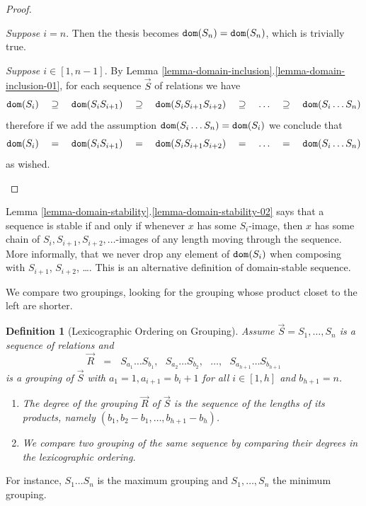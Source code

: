 \documentclass{lmcs}
\newtheorem{definition}[theorem]{Definition}
\begin{document}
\begin{proof}
\begin{enumerate}
\emph{Suppose $i=n$}. 
Then the thesis becomes ${\tt dom}(S_n) =  {\tt dom}(S_n)$, which is trivially true.

\emph{Suppose $i \in [1,n-1]$}.
By Lemma \ref{lemma-domain-inclusion}.\ref{lemma-domain-inclusion-01},
for each sequence $\vec{S}$ of relations we have 
$$
\dom(S_i)  \ \ \ \supseteq \ \ \ 
\dom(S_iS_{i+1})  \ \ \  \supseteq \ \ \ 
\dom(S_iS_{i+1}S_{i+2})  \ \ \  \supseteq  \ \ \ 
\ldots  \ \ \  \supseteq  \ \ \ 
\dom(S_i \ldots S_n)
$$ 
therefore if we add the assumption ${\tt dom}(S_i \ldots S_n) = {\tt dom}(S_i)$ we conclude that
$$
\dom(S_i)   \ \ \ =  \ \ \ 
\dom(S_iS_{i+1})  \ \ \  =  \ \ \ 
\dom(S_iS_{i+1}S_{i+2})   \ \ \ =  \ \ \ 
\ldots   \ \ \ =  \ \ \ 
\dom(S_i \ldots S_n)
$$ 
as wished.
 
\end{enumerate}
\end{proof}

Lemma \ref{lemma-domain-stability}.\ref{lemma-domain-stability-02}
says that a sequence is stable if and only if whenever $x$ has some $S_i$-image,
then $x$ has some chain of $S_i, S_{i+1}, S_{i+2}, \ldots$-images of any length
moving through the sequence. More informally, that we never drop any element of ${\tt dom}(S_i)$
when composing with $S_{i+1}$, $S_{i+2}$, \ldots.
This is an alternative definition of domain-stable sequence.

We compare two groupings, looking for the grouping whose product closet to the left 
are shorter.

\begin{definition}[Lexicographic Ordering on Grouping]
\label{definition-grouping-order}
Assume $\vec{S}=S_1, \ldots, S_n$ is a sequence of relations and 
$$
\vec{R} \ \ \ = \ \ \ 
S_{a_1} \ldots S_{b_1}, \ \ \ S_{a_2} \ldots S_{b_2}, \ \ \ \ldots, \ \ \ S_{a_{h+1}} \ldots S_{b_{h+1}}
$$
is a grouping of $\vec{S}$ with $a_1=1, a_{i+1} = b_i+1$ for all $i \in [1,h]$ and 
$b_{h+1} = n$.

\begin{enumerate}
\item
The degree of the grouping $\vec{R}$ of $\vec{S}$ is the sequence
of the lengths of its products, namely $(b_1, b_2 - b_1, \ldots, b_{h+1} - b_h)$. 
\item
We compare two grouping of the same sequence by comparing their degrees in the 
lexicographic ordering.
\end{enumerate}
\end{definition} 

For instance, 
$S_1 \ldots S_n$ is the maximum grouping and $S_1, \ldots, S_n$ the minimum grouping.
\end{document}
